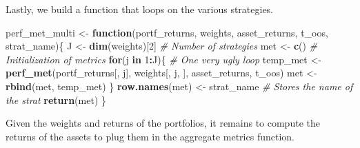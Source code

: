 \documentclass[]{krantz}
\makeatletter
\newenvironment{Shaded}{\begin{snugshade}}{\end{snugshade}}
\newcommand{\CommentTok}[1]{\textcolor[rgb]{0.37,0.37,0.37}{\textit{#1}}}
\newcommand{\ControlFlowTok}[1]{\textcolor[rgb]{0.27,0.27,0.27}{\textbf{#1}}}
\newcommand{\DataTypeTok}[1]{\textcolor[rgb]{0.27,0.27,0.27}{#1}}
\newcommand{\DecValTok}[1]{\textcolor[rgb]{0.06,0.06,0.06}{#1}}
\newcommand{\KeywordTok}[1]{\textcolor[rgb]{0.27,0.27,0.27}{\textbf{#1}}}
\newcommand{\NormalTok}[1]{#1}
\newcommand{\OperatorTok}[1]{\textcolor[rgb]{0.43,0.43,0.43}{\textbf{#1}}}
\newcommand{\StringTok}[1]{\textcolor[rgb]{0.5,0.5,0.5}{#1}}
\newenvironment{kframe}{%
\medskip{}
\setlength{\fboxsep}{.8em}
 \def\at@end@of@kframe{}%
 \ifinner\ifhmode%
  \def\at@end@of@kframe{\end{minipage}}%
  \begin{minipage}{\columnwidth}%
 \fi\fi%
 \def\FrameCommand##1{\hskip\@totalleftmargin \hskip-\fboxsep
 \colorbox{shadecolor}{##1}\hskip-\fboxsep
     \hskip-\linewidth \hskip-\@totalleftmargin \hskip\columnwidth}%
 \MakeFramed {\advance\hsize-\width
   \@totalleftmargin\z@ \linewidth\hsize
   \@setminipage}}%
 {\par\unskip\endMakeFramed%
 \at@end@of@kframe}
\renewenvironment{Shaded}{\begin{kframe}}{\end{kframe}}
\theoremstyle{definition}
\theoremstyle{definition}
\theoremstyle{definition}
\theoremstyle{remark}
\makeatother
\begin{document}
\normalsize

Lastly, we build a function that loops on the various strategies.

\footnotesize

\begin{Shaded}
\begin{Highlighting}[]
\NormalTok{perf_met_multi <-}\StringTok{ }\ControlFlowTok{function}\NormalTok{(portf_returns, weights, asset_returns, t_oos, strat_name)\{}
\NormalTok{    J <-}\StringTok{ }\KeywordTok{dim}\NormalTok{(weights)[}\DecValTok{2}\NormalTok{]              }\CommentTok{# Number of strategies }
\NormalTok{    met <-}\StringTok{ }\KeywordTok{c}\NormalTok{()                        }\CommentTok{# Initialization of metrics}
    \ControlFlowTok{for}\NormalTok{(j }\ControlFlowTok{in} \DecValTok{1}\OperatorTok{:}\NormalTok{J)\{                    }\CommentTok{# One very ugly loop}
\NormalTok{        temp_met <-}\StringTok{ }\KeywordTok{perf_met}\NormalTok{(portf_returns[, j], weights[, j, ], asset_returns, t_oos)}
\NormalTok{        met <-}\StringTok{ }\KeywordTok{rbind}\NormalTok{(met, temp_met)}
\NormalTok{    \}}
    \KeywordTok{row.names}\NormalTok{(met) <-}\StringTok{ }\NormalTok{strat_name      }\CommentTok{# Stores the name of the strat}
    \KeywordTok{return}\NormalTok{(met)}
\NormalTok{\}}
\end{Highlighting}
\end{Shaded}

\normalsize

Given the weights and returns of the portfolios, it remains to compute
the returns of the assets to plug them in the aggregate metrics
function.

\footnotesize

\begin{Shaded}
\end{Shaded}
\end{document}
